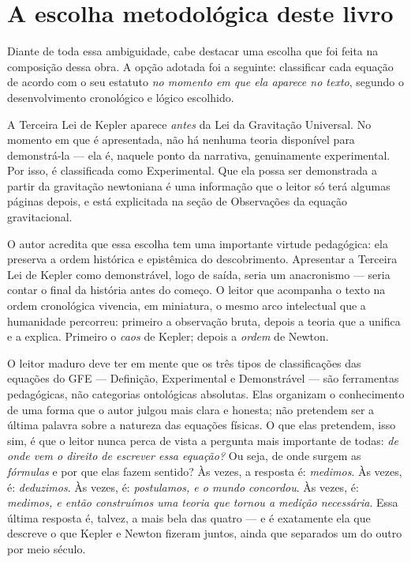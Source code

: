\section*{A escolha metodológica deste livro}

Diante de toda essa ambiguidade, cabe destacar uma escolha que foi feita na composição dessa obra. A opção adotada foi a
seguinte: classificar cada equação de acordo com o seu estatuto
\textit{no momento em que ela aparece no texto}, segundo o
desenvolvimento cronológico e lógico escolhido.

A Terceira Lei de Kepler aparece \textit{antes} da Lei da Gravitação
Universal. No momento em que é apresentada, não há nenhuma teoria
disponível para demonstrá-la --- ela é, naquele ponto da narrativa,
genuinamente experimental. Por isso, é classificada como Experimental.
Que ela possa ser demonstrada a partir da gravitação newtoniana é uma
informação que o leitor só terá algumas páginas depois, e está
explicitada na seção de Observações da equação gravitacional.

O autor acredita que essa escolha tem uma importante virtude pedagógica: ela preserva a ordem
histórica e epistêmica do descobrimento. Apresentar a Terceira Lei de
Kepler como demonstrável, logo de saída, seria um anacronismo --- seria
contar o final da história antes do começo. O leitor que acompanha o
texto na ordem cronológica vivencia, em miniatura, o mesmo arco
intelectual que a humanidade percorreu: primeiro a observação bruta,
depois a teoria que a unifica e a explica. Primeiro o \emph{caos} de Kepler;
depois a \emph{ordem} de Newton.

O leitor maduro deve ter em mente que os três tipos de classificações das equações do GFE ---
Definição, Experimental e Demonstrável --- são ferramentas pedagógicas,
não categorias ontológicas absolutas. Elas organizam o conhecimento de
uma forma que o autor julgou mais clara e honesta; não pretendem ser a
última palavra sobre a natureza das equações físicas. O que elas
pretendem, isso sim, é que o leitor nunca perca de vista a pergunta
mais importante de todas: \textit{de onde vem o direito de escrever
essa equação?} Ou seja, de onde surgem as \emph{fórmulas} e por que elas fazem sentido? Às vezes, a resposta é: \textit{medimos}. Às vezes, é:
\textit{deduzimos}. Às vezes, é: \textit{postulamos, e o mundo
concordou}. Às vezes, é: \textit{medimos, e então construímos uma teoria
que tornou a medição necessária}. Essa última resposta é, talvez, a
mais bela das quatro --- e é exatamente ela que descreve o que Kepler
e Newton fizeram juntos, ainda que separados um do outro por meio século.